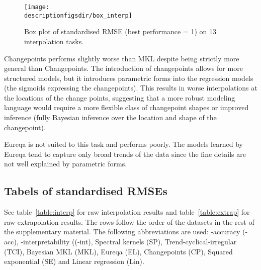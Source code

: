 \begin{figure*}[ht]
\centering
\texttt{[image: \\descriptionfigsdir/box\_interp]}
\caption[RMSE comparison of \procedurename{} and other algorithms at interpolation.]{
Box plot of standardised RMSE (best performance = 1) on 13 interpolation tasks.
}
\label{fig:box_interp}
\end{figure*}

Changepoints performs slightly worse than MKL despite being strictly more general than Changepoints.
The introduction of changepoints allows for more structured models, but it introduces parametric forms into the regression models (\ie the sigmoids expressing the changepoints).
This results in worse interpolations at the locations of the change points, suggesting that a more robust modeling language would require a more flexible class of changepoint shapes or improved inference (\eg fully Bayesian inference over the location and shape of the changepoint).

Eureqa is not suited to this task and performs poorly.
The models learned by Eureqa tend to capture only broad trends of the data since the fine details are not well explained by parametric forms.

\subsection{Tabels of standardised RMSEs}

See table~\ref{table:interp} for raw interpolation results and table~\ref{table:extrap} for raw extrapolation results. 
The rows follow the order of the datasets in the rest of the supplementary material.
The following abbreviations are used: \procedurename{}-accuracy (\procedurename{}-acc), \procedurename{}-interpretability ((\procedurename{}-int), Spectral kernels (SP), Trend-cyclical-irregular (TCI), Bayesian MKL (MKL), Eureqa (EL), Changepoints (CP), Squared exponential (SE) and Linear regression (Lin).


